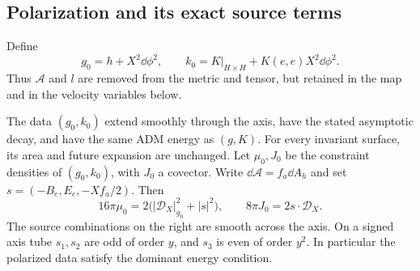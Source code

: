 \subsection{Polarization and its exact source terms}

Define
\begin{equation}\label{a:polarized-data}
 g_0=h+X^2\dd\phi^2,
 \qquad
 k_0=K|_{H\times H}+K(e,e)X^2\dd\phi^2.
\end{equation}
Thus $\mathcal A$ and $l$ are removed from the metric and tensor,
but retained in the map and in the velocity variables below.

\begin{proposition}[Polarization]\label{a:polarization}
The data $(g_0,k_0)$ extend smoothly through the axis, have the
stated asymptotic decay, and have the same ADM energy as $(g,K)$.
For every invariant surface, its area and future expansion are
unchanged.  Let $\mu_0,J_0$ be the constraint densities of
$(g_0,k_0)$, with $J_0$ a covector.  Write
$\dd\mathcal A=f_a\dd A_h$ and set
$s=(-B_e,E_e,-Xf_a/2)$.  Then
\begin{equation}\label{a:constraints}
 16\pi\mu_0=2\big(|\mathcal D_X|_{g_0}^2+|s|^2\big),
 \qquad
 8\pi J_0=2s\cdot\mathcal D_X.
\end{equation}
The source combinations on the right are smooth across the axis.
On a signed axis tube $s_1,s_2$ are odd of order $y$, and $s_3$
is even of order $y^2$.  In particular the polarized data satisfy
the dominant energy condition.
\end{proposition}

